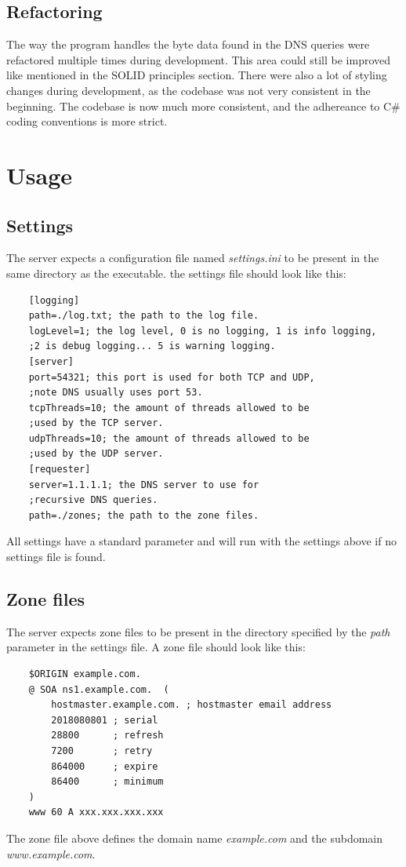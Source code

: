 \documentclass[12pt]{article}
\begin{document}
\subsection{Refactoring}
The way the program handles the byte data found in the DNS queries were refactored multiple times during development.
This area could still be improved like mentioned in the SOLID principles section. There were also a lot of styling changes during development,
as the codebase was not very consistent in the beginning. The codebase is now much more consistent, and the adhereance to C\# coding conventions\cite{billwagnerNETDocumentationCoding2023} is
more strict.

\section{Usage}
\subsection{Settings}
The server expects a configuration file named \textit{settings.ini} to be present in the same directory as the executable.
the settings file should look like this:
\begin{lstlisting}
    [logging]
    path=./log.txt; the path to the log file.
    logLevel=1; the log level, 0 is no logging, 1 is info logging, 
    ;2 is debug logging... 5 is warning logging.
    [server]
    port=54321; this port is used for both TCP and UDP,
    ;note DNS usually uses port 53.
    tcpThreads=10; the amount of threads allowed to be 
    ;used by the TCP server.
    udpThreads=10; the amount of threads allowed to be 
    ;used by the UDP server.
    [requester]
    server=1.1.1.1; the DNS server to use for 
    ;recursive DNS queries.
    path=./zones; the path to the zone files.
\end{lstlisting}
All settings have a standard parameter and will run with the settings above if no settings file is found.

\subsection{Zone files}
The server expects zone files to be present in the directory specified by the \textit{path} parameter in the settings file.
A zone file should look like this:
\begin{lstlisting}
    $ORIGIN example.com.
    @ SOA ns1.example.com.  (
        hostmaster.example.com. ; hostmaster email address
        2018080801 ; serial
        28800      ; refresh
        7200       ; retry
        864000     ; expire
        86400      ; minimum
    )
    www 60 A xxx.xxx.xxx.xxx
\end{lstlisting}
The zone file above defines the domain name \textit{example.com} and the subdomain \textit{www.example.com}.

\printbibliography
\end{document}
